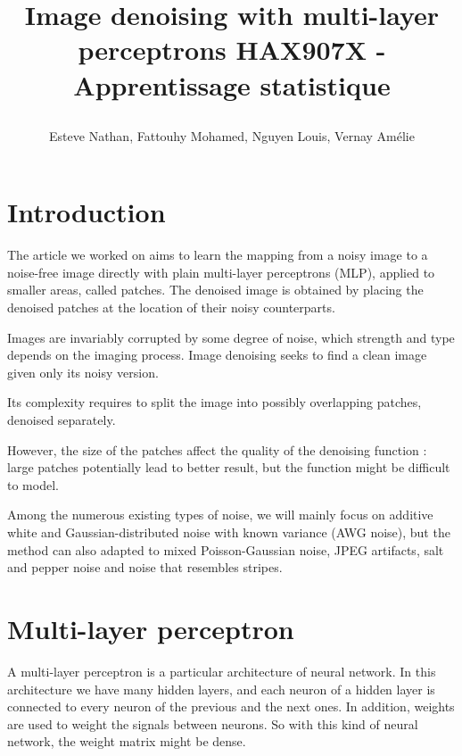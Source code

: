 \documentclass[10pt,a4paper]{article}
\author{Esteve Nathan, Fattouhy Mohamed, Nguyen Louis, Vernay Amélie}
\title{%
    \begin{minipage}\linewidth
        \centering
        Image denoising with multi-layer perceptrons
        \vskip3pt
        \large 
        HAX907X - Apprentissage statistique
    \end{minipage}
}
\newcommand{\svs}{\vspace{9pt}}
\begin{document}
\maketitle

\section{Introduction}

The article we worked on \cite{denoise} aims to learn the mapping from a noisy image to a noise-free image directly with plain multi-layer perceptrons (MLP), applied to smaller areas, called patches. The denoised image is obtained by placing the denoised patches at the location of their noisy counterparts.

\svs

Images are invariably corrupted by some degree of noise, which strength and type depends on the imaging process. Image denoising seeks to find a clean image given only its noisy version.

\svs

Its complexity requires to split the image into possibly overlapping patches, denoised separately.

\svs

However, the size of the patches affect the quality of the denoising function : large patches potentially lead to better result, but the function might be difficult to model.

\svs

Among the numerous existing types of noise, we will mainly focus on additive white and Gaussian-distributed noise with known variance (AWG noise), but the method can also adapted to mixed Poisson-Gaussian noise, JPEG artifacts, salt and pepper noise and noise that resembles stripes.


\section{Multi-layer perceptron}

A multi-layer perceptron is a particular architecture of neural network. In this architecture we have many hidden layers, and each neuron of a hidden layer is connected to every neuron of the previous and the next ones.  In addition, weights are used to weight the signals between neurons. So with this kind of neural network, the weight matrix might be dense.

\end{document}

